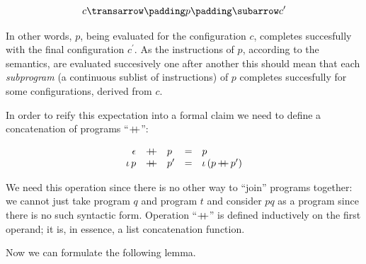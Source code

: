 \[
\trans{c}{p}{c^\prime}
\]

In other words, $p$, being evaluated for the configuration $c$, completes succesfully with the final configuration $c^\prime$. As the instructions 
of $p$, according to the semantics, are evaluated succesively one after another this should mean that each \emph{subprogram} (a continuous sublist
of instructions) of $p$ completes succesfully for some configurations, derived from $c$.

In order to reify this expectation into a formal claim we need to define a concatenation of programs ``$\operatorname{+\kern -0.4em+}$'':

\[
\begin{array}{rclcl}
\epsilon & \operatorname{+\kern -0.4em+} & p       & = & p\\
\iota\,p & \operatorname{+\kern -0.4em+} & p^\prime & = & \iota\,(p \operatorname{+\kern -0.4em+} p^\prime)
\end{array}
\]

We need this operation since there is no other way to ``join'' programs together: we cannot just take program $q$ and program $t$ and consider $pq$ as
a program since there is no such syntactic form. Operation ``$\operatorname{+\kern -0.4em+}$'' is defined inductively on the first operand; it is, in essence, a list
concatenation function.
\FloatBarrier

Now we can formulate the following lemma.

